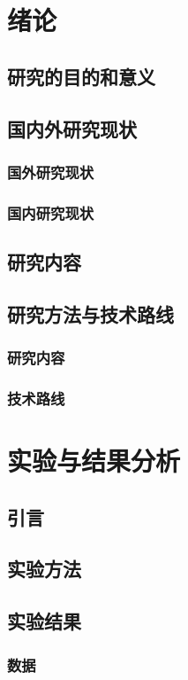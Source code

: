 \documentclass{ctexbook}
\begin{document}
	\tableofcontents
	
	\chapter{绪论}
	\section{研究的目的和意义}
	\section{国内外研究现状}
	\subsection{国外研究现状}
	\subsection{国内研究现状}
	
	\section{研究内容}
	\section{研究方法与技术路线}
	\subsection{研究内容}
	\subsection{技术路线}
	
	\chapter{实验与结果分析}
	\section{引言}
	\section{实验方法}
	\section{实验结果}
	\subsection{数据}
\end{document}
